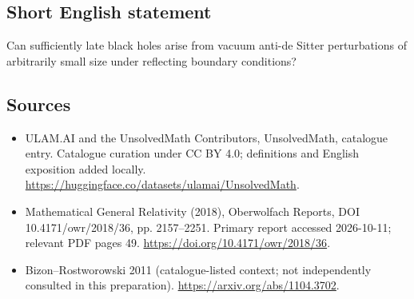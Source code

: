 \documentclass[11pt]{article}
\begin{document}
\subsection{Short English statement}
Can sufficiently late black holes arise from vacuum anti-de Sitter perturbations of arbitrarily small size under reflecting boundary conditions?
\subsection{Sources}
\begin{itemize}
\item[\hypertarget{source:statement:1}{S1}] ULAM.AI and the UnsolvedMath Contributors, UnsolvedMath, catalogue entry. Catalogue curation under CC BY 4.0; definitions and English exposition added locally.
\url{https://huggingface.co/datasets/ulamai/UnsolvedMath}.
\item[\hypertarget{source:statement:2}{S2}] Mathematical General Relativity (2018), Oberwolfach Reports, DOI 10.4171/owr/2018/36, pp. 2157--2251. Primary report accessed 2026-10-11; relevant PDF pages 49.
\url{https://doi.org/10.4171/owr/2018/36}.
\item[\hypertarget{source:statement:3}{S3}] Bizon--Rostworowski 2011 (catalogue-listed context; not independently consulted in this preparation).
\url{https://arxiv.org/abs/1104.3702}.
\end{itemize}
\label{end:statement}
\end{document}
